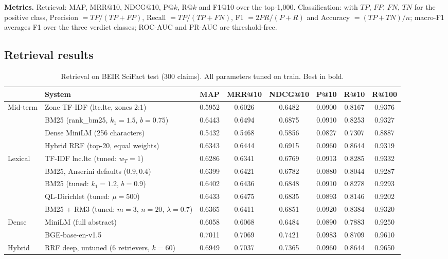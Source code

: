 \documentclass[conference]{IEEEtran}
\begin{document}
\textbf{Metrics.} Retrieval: MAP, MRR@10, NDCG@10, P@$k$, R@$k$ and F1@10 over the top-1,000. Classification: with $TP$, $FP$,
$FN$, $TN$ for the positive class, Precision $=TP/(TP+FP)$, Recall $=TP/(TP+FN)$, F1 $=2PR/(P+R)$ and Accuracy
$=(TP+TN)/n$; macro-F1 averages F1 over the three verdict classes; ROC-AUC and PR-AUC are threshold-free.

\subsection{Retrieval results}
\begin{table}[t]
\centering
\caption{Retrieval on BEIR SciFact test (300 claims). All parameters tuned on train. Best in bold.}
\label{tab:retrieval}
\footnotesize
\begin{tabular}{@{}llcccccc@{}}
\toprule
& System & MAP & MRR@10 & NDCG@10 & P@10 & R@10 & R@100 \\
\midrule
\multirow{4}{*}{Mid-term} & Zone TF-IDF (ltc.ltc, zones 2:1) & 0.5952 & 0.6026 & 0.6482 & 0.0900 & 0.8167 & 0.9376 \\
& BM25 (rank\_bm25, $k_1{=}1.5$, $b{=}0.75$) & 0.6443 & 0.6494 & 0.6875 & 0.0910 & 0.8253 & 0.9327 \\
& Dense MiniLM (256 characters) & 0.5432 & 0.5468 & 0.5856 & 0.0827 & 0.7307 & 0.8887 \\
& Hybrid RRF (top-20, equal weights) & 0.6343 & 0.6444 & 0.6915 & 0.0960 & 0.8644 & 0.9319 \\
\midrule
\multirow{5}{*}{Lexical} & TF-IDF lnc.ltc (tuned: $w_T{=}1$) & 0.6286 & 0.6341 & 0.6769 & 0.0913 & 0.8285 & 0.9332 \\
& BM25, Anserini defaults ($0.9, 0.4$) & 0.6399 & 0.6421 & 0.6782 & 0.0880 & 0.8044 & 0.9287 \\
& BM25 (tuned: $k_1{=}1.2$, $b{=}0.9$) & 0.6402 & 0.6436 & 0.6848 & 0.0910 & 0.8278 & 0.9293 \\
& QL-Dirichlet (tuned: $\mu{=}500$) & 0.6433 & 0.6475 & 0.6835 & 0.0893 & 0.8146 & 0.9202 \\
& BM25 + RM3 (tuned: $m{=}3$, $n{=}20$, $\lambda{=}0.7$) & 0.6365 & 0.6411 & 0.6851 & 0.0920 & 0.8384 & 0.9320 \\
\midrule
\multirow{2}{*}{Dense} & MiniLM (full abstract) & 0.6058 & 0.6068 & 0.6484 & 0.0890 & 0.7883 & 0.9250 \\
& BGE-base-en-v1.5 & 0.7011 & 0.7069 & 0.7421 & 0.0983 & 0.8709 & 0.9610 \\
\midrule
\multirow{5}{*}{Hybrid} & RRF deep, untuned (6 retrievers, $k{=}60$) & 0.6949 & 0.7037 & 0.7365 & 0.0960 & 0.8644 & 0.9650 \\

\end{tabular}
\end{table}
\end{document}
